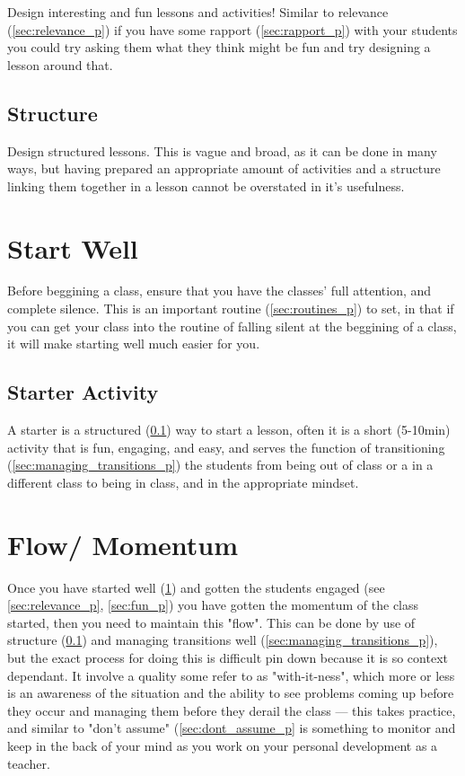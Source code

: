 \documentclass[12pt]{report}
\begin{document}
Design interesting and fun lessons and activities! Similar to relevance (\ref{sec:relevance_p}) if you have some rapport (\ref{sec:rapport_p}) with your students you could try asking them what they think might be fun and try designing a lesson around that.

\subsection{Structure}
\label{sec:structure_p}

Design structured lessons. This is vague and broad, as it can be done in many ways, but having prepared an appropriate amount of activities and a structure linking them together in a lesson cannot be overstated in it's usefulness.



\section{Start Well}
\label{sec:start_well_p}

Before beggining a class, ensure that you have the classes' full attention, and complete silence. This is an important routine (\ref{sec:routines_p}) to set, in that if you can get your class into the routine of falling silent at the beggining of a class, it will make starting well much easier for you.

\subsection{Starter Activity}
\label{sec:starter_acivity_p}

A starter is a structured (\ref{sec:structure_p}) way to start a lesson, often it is a short (5-10min) activity that is fun, engaging, and easy, and serves the function of transitioning (\ref{sec:managing_transitions_p}) the students from being out of class or a in a different class to being in class, and in the appropriate mindset.




\section{Flow/ Momentum}
\label{sec:flow_p}

Once you have started well (\ref{sec:start_well_p}) and gotten the students engaged (see \ref{sec:relevance_p}, \ref{sec:fun_p}) you have gotten the momentum of the class started, then you need to maintain this "flow". This can be done by use of structure (\ref{sec:structure_p}) and managing transitions well (\ref{sec:managing_transitions_p}), but the exact process for doing this is difficult pin down because it is so context dependant. It involve a quality some refer to as "with-it-ness", which more or less is an awareness of the situation and the ability to see problems coming up before they occur and managing them before they derail the class --- this takes practice, and similar to "don't assume" (\ref{sec:dont_assume_p} is something to monitor and keep in the back of your mind as you work on your personal development as a teacher.
\end{document}
